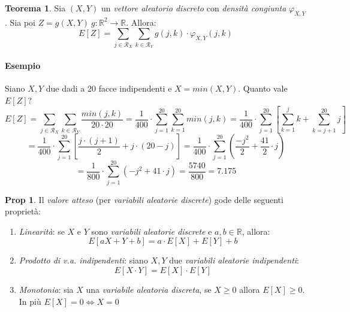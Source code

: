 \documentclass[12pt, a4paper]{report}
\theoremstyle{definition}
\newtheorem{theorem}{Teorema}[section]
\newtheorem*{proposition}{Prop}
\DeclareRobustCommand{\R}{\mathbb{R}}%
\DeclareRobustCommand{\supp}{\mathcal{R}}%
\begin{document}
\begin{theorem}
	Sia $(X,Y)$ un \emph{vettore aleatorio discreto} con \emph{densità congiunta}
	$\varphi_{X,Y}$. Sia poi \(Z=g(X,Y)\ g:\R^2\rightarrow\R\). Allora:
	\[E[Z]=\sum_{j\in\supp_X}\sum_{k\in\supp_Y}g(j,k)\cdot \varphi_{X,Y}(j,k)\]
\end{theorem}

\paragraph*{Esempio}
Siano $X,Y$ due dadi a 20 facce indipendenti e $X=min(X,Y)$. Quanto vale $E[Z]$?
\[E[Z]=\sum_{j\in\supp_X}\sum_{k\in\supp_Y}\frac{min(j,k)}{20\cdot 20}=\frac{1}{400}\cdot 
\sum_{j=1}^{20}\sum_{k=1}^{20}min(j,k)=\frac{1}{400}\cdot \sum_{j=1}^{20}\left[\sum_
{k=1}^{j}k+\sum_{k=j+1}^{20}j\right]\]
\[=\frac{1}{400}\cdot \sum_{j=1}^{20}\left[\frac{j\cdot (j+1)}{2}+j\cdot (20-j)\right]=\frac{1}
{400}\cdot \sum_{j=1}^{20}\left(\frac{-j^2}{2}+\frac{41}{2}\cdot j\right)\]
\[=\frac{1}{800}\cdot \sum_{j=1}^{20}(-j^2+41\cdot j)=\frac{5740}{800}=7.175\]

\begin{proposition}
	Il \emph{valore atteso} (per \emph{variabili aleatorie discrete}) gode delle
	seguenti proprietà:
	\begin{enumerate}[label=(\roman*)]
		\item \emph{Linearità}: se $X$ e $Y$ sono \emph{variabili aleatorie discrete}
		e $a,b\in\R$, allora:
		\[E[aX+Y+b]=a\cdot E[X]+E[Y]+b\]
		\item \emph{Prodotto di v.a. indipendenti}: siano $X,Y$ due \emph{variabili
		aleatorie indipendenti}:
		\[E[X\cdot Y]=E[X]\cdot E[Y]\]
		\item \emph{Monotonia}: sia $X$ una \emph{variabile aleatoria discreta},
		se $X\geq 0$ allora $E[X]\geq 0$. In più \(E[X]=0\Leftrightarrow X=0\)
	\end{enumerate}
\end{proposition}
\end{document}
